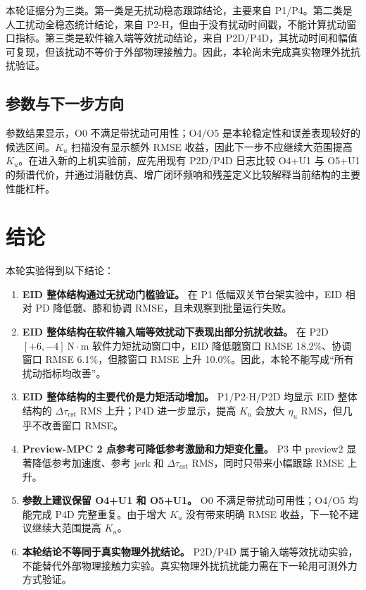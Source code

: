 \documentclass[12pt,a4paper]{ctexart}
\begin{document}
本轮证据分为三类。第一类是无扰动稳态跟踪结论，主要来自 P1/P4。第二类是人工扰动全稳态统计结论，来自 P2-H，但由于没有扰动时间戳，不能计算扰动窗口指标。第三类是软件输入端等效扰动结论，来自 P2D/P4D，其扰动时间和幅值可复现，但该扰动不等价于外部物理接触力。因此，本轮尚未完成真实物理外扰抗扰验证。

\subsection{参数与下一步方向}


参数结果显示，O0 不满足带扰动可用性；O4/O5 是本轮稳定性和误差表现较好的候选区间。$K_u$ 扫描没有显示额外 RMSE 收益，因此下一步不应继续大范围提高 $K_u$。在进入新的上机实验前，应先用现有 P2D/P4D 日志比较 O4+U1 与 O5+U1 的频谱代价，并通过消融仿真、增广闭环频响和残差定义比较解释当前结构的主要性能杠杆。

\section{结论}


本轮实验得到以下结论：

\begin{enumerate}[label=\arabic*.]
\item \textbf{EID 整体结构通过无扰动门槛验证。} 在 P1 低幅双关节台架实验中，EID 相对 PD 降低髋、膝和协调 RMSE，且未观察到批量运行失败。
\item \textbf{EID 整体结构在软件输入端等效扰动下表现出部分抗扰收益。} 在 P2D $[+6,-4]\ \mathrm{N\cdot m}$ 软件力矩扰动窗口中，EID 降低髋窗口 RMSE 18.2\%、协调窗口 RMSE 6.1\%，但膝窗口 RMSE 上升 10.0\%。因此，本轮不能写成“所有扰动指标均改善”。
\item \textbf{EID 整体结构的主要代价是力矩活动增加。} P1/P2-H/P2D 均显示 EID 整体结构的 $\Delta\tau_\mathrm{est}$ RMS 上升；P4D 进一步显示，提高 $K_u$ 会放大 $\eta_u$ RMS，但几乎不改善窗口 RMSE。
\item \textbf{Preview-MPC 2 点参考可降低参考激励和力矩变化量。} P3 中 preview2 显著降低参考加速度、参考 jerk 和 $\Delta\tau_\mathrm{est}$ RMS，同时只带来小幅跟踪 RMSE 上升。
\item \textbf{参数上建议保留 O4+U1 和 O5+U1。} O0 不满足带扰动可用性；O4/O5 均能完成 P4D 完整重复。由于增大 $K_u$ 没有带来明确 RMSE 收益，下一轮不建议继续大范围提高 $K_u$。
\item \textbf{本轮结论不等同于真实物理外扰结论。} P2D/P4D 属于输入端等效扰动实验，不能替代外部物理接触力实验。真实物理外扰抗扰能力需在下一轮用可测外力方式验证。
\end{enumerate}
\end{document}
